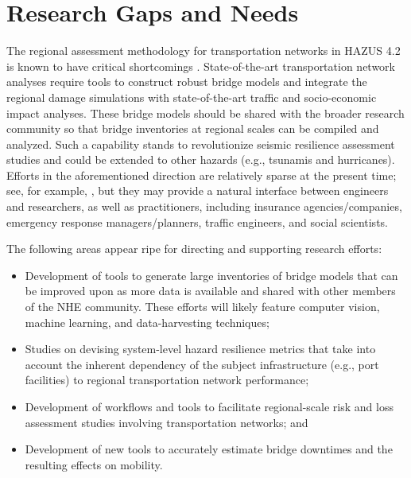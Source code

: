 \section{Research Gaps and Needs}
\label{sec:perf_transport_gaps}

The regional assessment methodology for transportation networks in HAZUS 4.2 is known to have critical shortcomings \citep[e.g.][]{mangalathu2017bridge}. State-of-the-art transportation network analyses require tools to construct robust bridge models and integrate the regional damage simulations with state-of-the-art traffic and socio-economic impact analyses. These bridge models should be shared with the broader research community so that bridge inventories at regional scales can be compiled and analyzed. Such a capability stands to revolutionize seismic resilience assessment studies and could be extended to other hazards (e.g., tsunamis and hurricanes). Efforts in the aforementioned direction are relatively sparse at the present time; see, for example, \citet{koc2020comprehensive}, but they may provide a natural interface between engineers and researchers, as well as practitioners, including insurance agencies/companies, emergency response managers/planners, traffic engineers, and social scientists. 

The following areas appear ripe for directing and supporting research efforts:
\begin{itemize}
    \item Development of tools to generate large inventories of bridge models that can be improved upon as more data is available and shared with other members of the NHE community. These efforts will likely feature computer vision, machine learning, and data-harvesting techniques;

    \item Studies on devising system-level hazard resilience metrics that take into account the inherent dependency of the subject infrastructure (e.g., port facilities) to regional transportation network performance;

    \item Development of workflows and tools to facilitate regional-scale risk and loss assessment studies involving transportation networks; and

    \item Development of new tools to accurately estimate bridge downtimes and the resulting effects on mobility.
\end{itemize}

